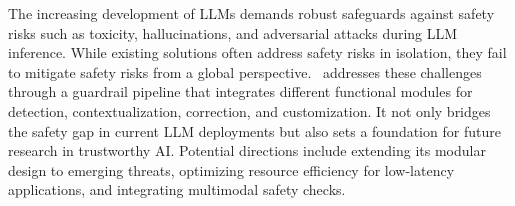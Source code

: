 

The increasing development of LLMs demands robust safeguards against safety risks  such as toxicity, hallucinations, and adversarial attacks during LLM inference.  
While existing solutions often address safety risks in isolation, they fail to 
mitigate safety
risks from a global perspective. \goodname~addresses these challenges through a guardrail pipeline that integrates different functional modules for detection, contextualization, correction, and customization. 
It not only bridges the safety gap in current LLM deployments but also sets a foundation for future research in trustworthy AI. 
Potential directions include extending its modular design to emerging threats, optimizing resource efficiency for low-latency applications, and integrating multimodal safety checks. 


